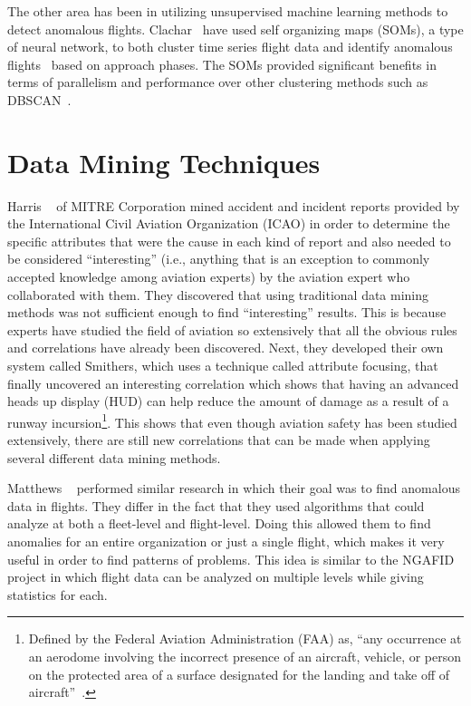     The other area has been in utilizing unsupervised machine learning methods to detect anomalous flights.  Clachar \etal\ have used self organizing maps (SOMs), a type of neural network, to both cluster time series flight data and identify anomalous flights~\cite{sophine2014identifying,sophine2016phd} based on approach phases. The SOMs provided significant benefits in terms of parallelism and performance over other clustering methods such as DBSCAN~\cite{ester1996a-density-based}.


\section{Data Mining Techniques}

	Harris \etal~\cite{harris-jr.1998recent} of MITRE Corporation mined accident and incident reports provided by the International Civil Aviation Organization (ICAO) in order to determine the specific attributes that were the cause in each kind of report and also needed to be considered ``interesting'' (i.e., anything that is an exception to commonly accepted knowledge among aviation experts) by the aviation expert who collaborated with them.  They discovered that using traditional data mining methods was not sufficient enough to find ``interesting'' results.  This is because experts have studied the field of aviation so extensively that all the obvious rules and correlations have already been discovered.  Next, they developed their own system called Smithers, which uses a technique called attribute focusing, that finally uncovered an interesting correlation which shows that having an advanced heads up display (HUD) can help reduce the amount of damage as a result of a runway incursion\footnote{Defined by the Federal Aviation Administration (FAA) as, ``any occurrence at an aerodome involving the incorrect presence of an aircraft, vehicle, or person on the protected area of a surface designated for the landing and take off of aircraft''~\cite{federal-aviation-administrationrunway}.}.  This shows that even though aviation safety has been studied extensively, there are still new correlations that can be made when applying several different data mining methods.
    
    Matthews \etal~\cite{matthews2013discovering} performed similar research in which their goal was to find anomalous data in flights.  They differ in the fact that they used algorithms that could analyze at both a fleet-level and flight-level.  Doing this allowed them to find anomalies for an entire organization or just a single flight, which makes it very useful in order to find patterns of problems.  This idea is similar to the NGAFID project in which flight data can be analyzed on multiple levels while giving statistics for each.
